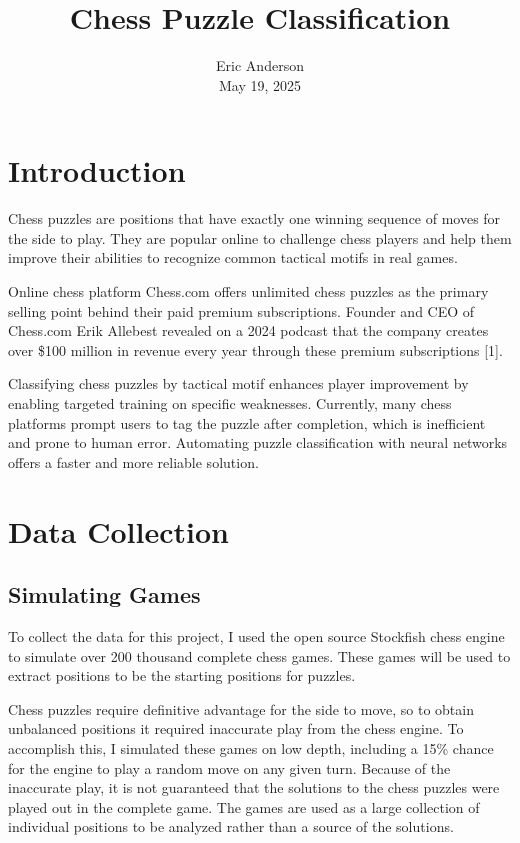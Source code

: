 \documentclass{article}
\title{Chess Puzzle Classification}
\author{
Eric Anderson\\
May 19, 2025\\
}
\begin{document}
\maketitle

\section{Introduction}

Chess puzzles are positions that have exactly one winning sequence of moves for the side to play. They are popular online to challenge chess players and help them improve their abilities to recognize common tactical motifs in real games.

Online chess platform Chess.com offers unlimited chess puzzles as the primary selling point behind their paid premium subscriptions. Founder and CEO of Chess.com Erik Allebest revealed on a 2024 podcast that the company creates over \$100 million in revenue every year through these premium subscriptions [1].

Classifying chess puzzles by tactical motif enhances player improvement by enabling targeted training on specific weaknesses. Currently, many chess platforms prompt users to tag the puzzle after completion, which is inefficient and prone to human error. Automating puzzle classification with neural networks offers a faster and more reliable solution.


\section{Data Collection}

\subsection{Simulating Games}

To collect the data for this project, I used the open source Stockfish chess engine to simulate over 200 thousand complete chess games. These games will be used to extract positions to be the starting positions for puzzles.

Chess puzzles require definitive advantage for the side to move, so to obtain unbalanced positions it required inaccurate play from the chess engine. To accomplish this, I simulated these games on low depth, including a 15\% chance for the engine to play a random move on any given turn. Because of the inaccurate play, it is not guaranteed that the solutions to the chess puzzles were played out in the complete game. The games are used as a large collection of individual positions to be analyzed rather than a source of the solutions.
\end{document}
